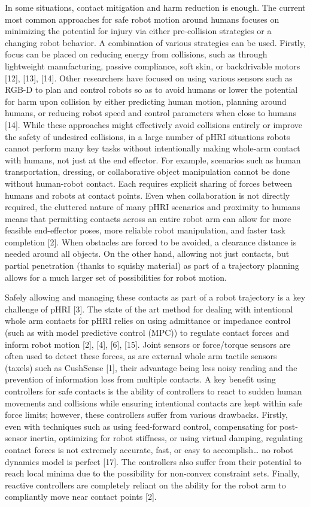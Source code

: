 \documentclass[conference]{IEEEtran}
\begin{document}
In some situations, contact mitigation and harm reduction is enough. The current most common approaches for safe robot motion around humans focuses on minimizing the potential for injury via either pre-collision strategies or a changing robot behavior. A combination of various strategies can be used. Firstly, focus can be placed on reducing energy from collisions, such as through lightweight manufacturing, passive compliance, soft skin, or backdrivable motors [12], [13], [14]. Other researchers have focused on using various sensors such as RGB-D to plan and control robots so as to avoid humans or lower the potential for harm upon collision by either predicting human motion, planning around humans, or reducing robot speed and control parameters when close to humans [14]. While these approaches might effectively avoid collisions entirely or improve the safety of undesired collisions, in a large number of pHRI situations robots cannot perform many key tasks without intentionally making whole-arm contact with humans, not just at the end effector. For example, scenarios such as human transportation, dressing, or collaborative object manipulation cannot be done without human-robot contact. Each requires explicit sharing of forces between humans and robots at contact points. Even when collaboration is not directly required, the cluttered nature of many pHRI scenarios and proximity to humans means that permitting contacts across an entire robot arm can allow for more feasible end-effector poses, more reliable robot manipulation, and faster task completion [2]. When obstacles are forced to be avoided, a clearance distance is needed around all objects. On the other hand, allowing not just contacts, but partial penetration (thanks to squishy material) as part of a trajectory planning allows for a much larger set of possibilities for robot motion. 

Safely allowing and managing these contacts as part of a robot trajectory is a key challenge of pHRI [3]. The state of the art method for dealing with intentional whole arm contacts for pHRI relies on using admittance or impedance control (such as with model predictive control (MPC)) to regulate contact forces and inform robot motion [2], [4], [6], [15]. Joint sensors or force/torque sensors are often used to detect these forces, as are external whole arm tactile sensors (taxels) such as CushSense [1], their advantage being less noisy reading and the prevention of information loss from multiple contacts. A key benefit using controllers for safe contacts is the ability of controllers to react to sudden human movements and collisions while ensuring intentional contacts are kept within safe force limits; however, these controllers suffer from various drawbacks. Firstly, even with techniques such as using feed-forward control, compensating for post-sensor inertia, optimizing for robot stiffness, or using virtual damping, regulating contact forces is not extremely accurate, fast, or easy to accomplish… no robot dynamics model is perfect [17]. The controllers also suffer from their potential to reach local minima due to the possibility for non-convex constraint sets. Finally, reactive controllers are completely reliant on the ability for the robot arm to compliantly move near contact points [2]. 
\end{document}
